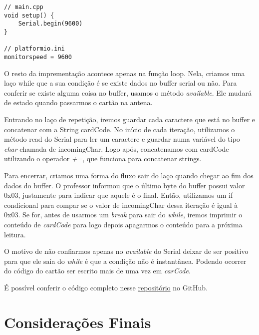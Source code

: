 \documentclass[12pt]{article}
\begin{document}
\begin{lstlisting}
// main.cpp
void setup() {
    Serial.begin(9600)
}

// platformio.ini
monitorspeed = 9600

\end{lstlisting}

O resto da imprementação acontece apenas na função loop. Nela, criamos uma laço while que a sua condição é se existe dados no buffer serial ou não. Para conferir se existe alguma coisa no buffer, usamos o método \textit{available}. Ele mudará de estado quando passarmos o cartão na antena.

Entrando no laço de repetição, iremos guardar cada caractere que está no buffer e concatenar com a String cardCode. No início de cada iteração, utilizamos o método read do Serial para ler um caractere e guardar numa variável do tipo \textit{char} chamada de incomingChar. Logo após, concatenamos com cardCode utilizando o operador \textit{+=}, que funciona para concatenar strings.

 



Para encerrar, criamos uma forma do fluxo sair do laço quando chegar ao fim dos dados do buffer. O professor informou que o último byte do buffer possui valor 0x03, justamente para indicar que aquele é o final. Então, utilizamos um if condicional para compar se o valor de incomingChar dessa iteração é igual à 0x03. Se for, antes de usarmos um \textit{break} para sair do \textit{while}, iremos imprimir o conteúdo de \textit{cardCode} para logo depois apagarmos o conteúdo para a próxima leitura.



O motivo de não confiarmos apenas no \textit{available} do Serial deixar de ser positivo para que ele saia do \textit{while} é que a condição não é instantânea. Podendo ocorrer do código do cartão ser escrito mais de uma vez em \textit{carCode}.

É possível conferir o código completo nesse \href{https://github.com/fabricio-araujo94/microcontroladores/tree/main/leitura_cartao}{repositório} no GitHub.

\section{Considerações Finais}
\end{document}
